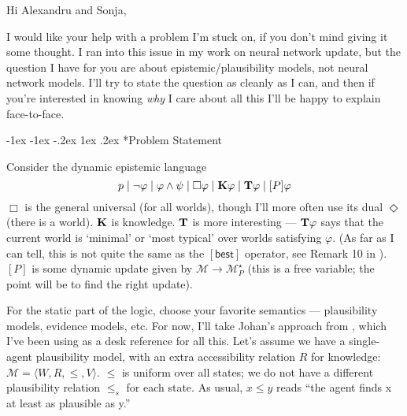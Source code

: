 \documentclass[letterpaper]{article}
\makeatletter
\theoremstyle{definition}
\newcounter{section}
\newcommand\section{\@startsection {section}{1}{\z@}%
                                   {-1ex \@plus -1ex \@minus -.2ex}%
                                   {1ex \@plus.2ex}%
                                   {\normalfont\large\bfseries}}
\newcommand{\Model}{\mathcal{M}}
\newcommand{\Typ}[1]{\textrm{\textup{\textbf{T}}} #1}
\newcommand{\Know}[1]{\textrm{\textup{\textbf{K}}} #1}
\newcommand{\KnowNoArgs}{\textrm{\textup{\textbf{K}}}}
\newcommand{\TypNoArgs}{\textrm{\textup{\textbf{T}}}}
\newcommand{\Update}[1]{[#1]}
\newcommand{\BestNoArgs}{[\mathsf{best}]}
\makeatother
\begin{document}
\opening{Hi Alexandru and Sonja,}

I would like your help with a problem I'm stuck on, if you don't mind giving it some thought.  I ran into this issue in my work on neural network update, but the question I have for you are about epistemic/plausibility models, not neural network models.  I'll try to state the question as cleanly as I can, and then if you're interested in knowing \emph{why} I care about all this I'll be happy to explain face-to-face.

\section*{Problem Statement}

Consider the dynamic epistemic language
\[
    p \mid \neg \varphi \mid \varphi \land \psi \mid \Box \varphi \mid \Know{\varphi} \mid \Typ{\varphi} \mid \Update{P} \varphi
\]
$\Box$ is the general universal (for all worlds), though I'll more often use its dual $\Diamond$ (there is a world). $\KnowNoArgs$ is knowledge.  $\TypNoArgs$ is more interesting --- $\Typ{\varphi}$ says that the current world is `minimal' or `most typical' over worlds satisfying $\varphi$.  (As far as I can tell, this is not quite the same as the $\BestNoArgs$ operator, see Remark 10 in \cite{van2007beliefrevision}).  $\Update{P}$ is some dynamic update given by $\Model \to \Model^\star_P$ (this is a free variable; the point will be to find the right update).  

For the static part of the logic, choose your favorite semantics --- plausibility models, evidence models, etc.  For now, I'll take Johan's approach from \cite{van2011logical}, which I've been using as a desk reference for all this.  Let's assume we have a single-agent plausibility model, with an extra accessibility relation $R$ for knowledge: $\Model = \langle W, R, \leq, V \rangle$.  $\leq$ is uniform over all states; we do not have a different plausibility relation $\leq_s$ for each state.  As usual, $x \leq y$ reads ``the agent finds x at least as plausible as y.''
\end{document}
